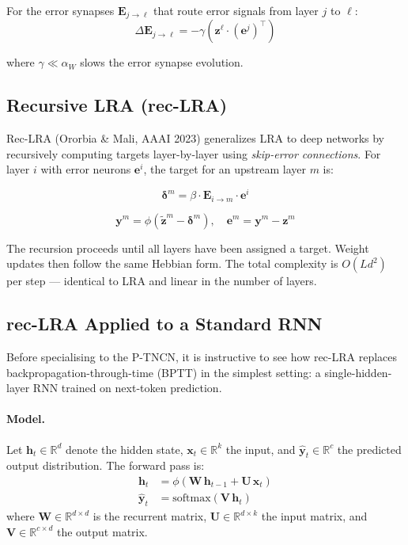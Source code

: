 \documentclass[11pt]{article}
\theoremstyle{definition}
\newcommand{\vz}{\mathbf{z}}
\newcommand{\vy}{\mathbf{y}}
\newcommand{\ve}{\mathbf{e}}
\newcommand{\E}{\mathbf{E}}
\begin{document}
For the error synapses $\E_{j \to \ell}$ that route error signals from layer $j$ to $\ell$:
\begin{equation}
  \Delta \E_{j \to \ell} = -\gamma \left(\vz^\ell \cdot (\ve^j)^\top\right)
\end{equation}

where $\gamma \ll \alpha_W$ slows the error synapse evolution.

\subsection{Recursive LRA (rec-LRA)}

Rec-LRA (Ororbia \& Mali, AAAI 2023) generalizes LRA to deep networks by
recursively computing targets layer-by-layer using \emph{skip-error connections}.
For layer $i$ with error neurons $\ve^i$, the target for an upstream layer $m$ is:

\begin{equation}
  \label{eq:reclra_target}
  \bm{\delta}^m = \beta \cdot \E_{i \to m} \cdot \ve^i
\end{equation}

\begin{equation}
  \label{eq:reclra_correction}
  \vy^m = \phi\!\left(\tilde{\vz}^m - \bm{\delta}^m\right), \quad \ve^m = \vy^m - \vz^m
\end{equation}

The recursion proceeds until all layers have been assigned a target. Weight
updates then follow the same Hebbian form. The total complexity is $O(Ld^2)$
per step — identical to LRA and linear in the number of layers.

\subsection{rec-LRA Applied to a Standard RNN}
\label{sec:reclra-rnn}

Before specialising to the P-TNCN, it is instructive to see how rec-LRA replaces
backpropagation-through-time (BPTT) in the simplest setting: a single-hidden-layer
RNN trained on next-token prediction.

\paragraph{Model.}
Let $\mathbf{h}_t \in \mathbb{R}^{d}$ denote the hidden state, $\mathbf{x}_t \in \mathbb{R}^{k}$
the input, and $\hat{\mathbf{y}}_t \in \mathbb{R}^{c}$ the predicted output distribution.
The forward pass is:
\begin{align}
  \mathbf{h}_t     &= \phi\!\left(\mathbf{W}\,\mathbf{h}_{t-1} + \mathbf{U}\,\mathbf{x}_t\right)
                      \label{eq:rnn_forward} \\
  \hat{\mathbf{y}}_t &= \mathrm{softmax}\!\left(\mathbf{V}\,\mathbf{h}_t\right)
                      \label{eq:rnn_output}
\end{align}
where $\mathbf{W} \in \mathbb{R}^{d \times d}$ is the recurrent matrix,
$\mathbf{U} \in \mathbb{R}^{d \times k}$ the input matrix, and
$\mathbf{V} \in \mathbb{R}^{c \times d}$ the output matrix.
\end{document}
